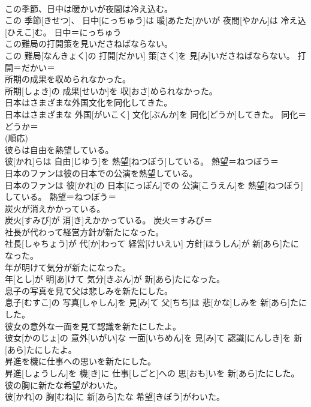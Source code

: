 \documentclass[8pt]{extreport}
\begin{document}
\begin{CJK}{UTF8}{min}
{\\	この季節、日中は暖かいが夜間は冷え込む。	
\\	この 季節[きせつ]、 日中[にっちゅう]は 暖[あたた]かいが 夜間[やかん]は 冷え込[ひえこ]む。	日中＝にっちゅう
\\	この難局の打開策を見いださねばならない。	
\\	この 難局[なんきょく]の 打開[だかい] 策[さく]を 見[み]いださねばならない。	打開＝だかい＝ 
\\	所期の成果を収められなかった。	
\\	所期[しょき]の 成果[せいか]を 収[おさ]められなかった。	
\\	日本はさまざまな外国文化を同化してきた。	
\\	日本はさまざまな 外国[がいこく] 文化[ぶんか]を 同化[どうか]してきた。	同化＝どうか＝ 
\\	(順応) 
\\	彼らは自由を熱望している。	
\\	彼[かれ]らは 自由[じゆう]を 熱望[ねつぼう]している。	熱望＝ねつぼう＝ 
\\	日本のファンは彼の日本での公演を熱望している。	
\\	日本のファンは 彼[かれ]の 日本[にっぽん]での 公演[こうえん]を 熱望[ねつぼう]している。	熱望＝ねつぼう＝ 
\\	炭火が消えかかっている。	
\\	炭火[すみび]が 消[き]えかかっている。	炭火＝すみび＝ 
\\	社長が代わって経営方針が新たになった。	
\\	社長[しゃちょう]が 代[か]わって 経営[けいえい] 方針[ほうしん]が 新[あら]たになった。	
\\	年が明けて気分が新たになった。	
\\	年[とし]が 明[あ]けて 気分[きぶん]が 新[あら]たになった。	
\\	息子の写真を見て父は悲しみを新たにした。	
\\	息子[むすこ]の 写真[しゃしん]を 見[み]て 父[ちち]は 悲[かな]しみを 新[あら]たにした。	
\\	彼女の意外な一面を見て認識を新たにしたよ。	
\\	彼女[かのじょ]の 意外[いがい]な 一面[いちめん]を 見[み]て 認識[にんしき]を 新[あら]たにしたよ。	
\\	昇進を機に仕事への思いを新たにした。	
\\	昇進[しょうしん]を 機[き]に 仕事[しごと]への 思[おも]いを 新[あら]たにした。	
\\	彼の胸に新たな希望がわいた。	
\\	彼[かれ]の 胸[むね]に 新[あら]たな 希望[きぼう]がわいた。	
}
\end{CJK}
\end{document}
